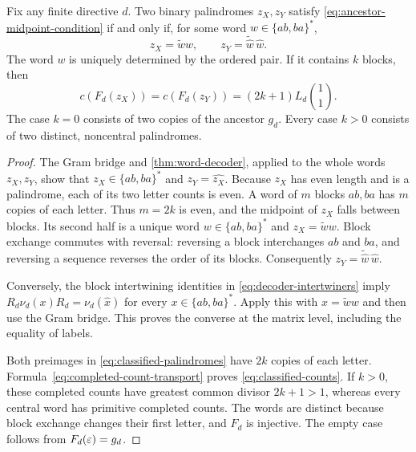 \begin{theorem}
\label{thm:palindromic-classification}
Fix any finite directive $d$. Two binary palindromes $z_X,z_Y$
satisfy \eqref{eq:ancestor-midpoint-condition} if and only if, for
some word $w\in\{ab,ba\}^*$,
\begin{equation}\label{eq:classified-palindromes}
 z_X=\widetilde w w,
 \qquad z_Y=\widetilde{\widehat w}\,\widehat w.
\end{equation}
The word $w$ is uniquely determined by the ordered pair.
If it contains $k$ blocks, then
\begin{equation}\label{eq:classified-counts}
 c(F_d(z_X))=c(F_d(z_Y))
 =(2k+1)L_d\binom11.
\end{equation}
The case $k=0$ consists of two copies of the ancestor $g_d$.
Every case $k>0$ consists of two distinct, noncentral palindromes.
\end{theorem}

\begin{proof}
The Gram bridge and \cref{thm:word-decoder}, applied to the
whole words $z_X,z_Y$, show that
$z_X\in\{ab,ba\}^*$ and $z_Y=\widehat{z_X}$.
Because $z_X$ has even length and is a palindrome, each of its two
letter counts is even. A word of $m$ blocks $ab,ba$ has $m$ copies
of each letter. Thus $m=2k$ is even, and the midpoint of $z_X$
falls between blocks. Its second half is a unique word
$w\in\{ab,ba\}^*$ and $z_X=\widetilde w w$.
Block exchange commutes with reversal: reversing a block interchanges
$ab$ and $ba$, and reversing a sequence reverses the order of its
blocks. Consequently
$z_Y=\widetilde{\widehat w}\,\widehat w$.

Conversely, the block intertwining identities in
\eqref{eq:decoder-intertwiners} imply
$R_d\nu_d(x)R_d=\nu_d(\widehat x)$ for every
$x\in\{ab,ba\}^*$. Apply this with $x=\widetilde w w$ and then
use the Gram bridge. This proves the converse at the matrix level,
including the equality of labels.

Both preimages in \eqref{eq:classified-palindromes} have $2k$ copies
of each letter. Formula~\eqref{eq:completed-count-transport} proves
\eqref{eq:classified-counts}. If $k>0$, these completed counts have
greatest common divisor $2k+1>1$, whereas every central word has
primitive completed counts. The words are distinct because block
exchange changes their first letter, and $F_d$ is injective. The
empty case follows from $F_d(\varepsilon)=g_d$.
\end{proof}

